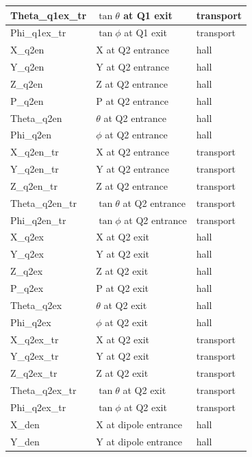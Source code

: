 \documentclass[11pt]{amsart}
\begin{document}
\begin{longtable}{| l | l | l |}
\hline
Theta\_q1ex\_tr       & $\tan{\theta}$ at Q1 exit  & transport\\
\hline
Phi\_q1ex\_tr         & $\tan{\phi}$ at Q1 exit  & transport\\
\hline
\hline
X\_q2en              & X at Q2 entrance  & hall \\
\hline
Y\_q2en              & Y at Q2 entrance  & hall \\
\hline
Z\_q2en              & Z at Q2 entrance  & hall \\
\hline
P\_q2en              & P at Q2 entrance  & hall \\
\hline
Theta\_q2en          & $\theta$ at Q2 entrance  & hall \\
\hline
Phi\_q2en            & $\phi$ at Q2 entrance  & hall \\
\hline
X\_q2en\_tr           & X at Q2 entrance  & transport\\
\hline
Y\_q2en\_tr           & Y at Q2 entrance  & transport\\
\hline
Z\_q2en\_tr           & Z at Q2 entrance  & transport\\
\hline
Theta\_q2en\_tr       & $\tan{\theta}$ at Q2 entrance  & transport\\
\hline
Phi\_q2en\_tr         & $\tan{\phi}$ at Q2 entrance  & transport\\
\hline
\hline
X\_q2ex              & X at Q2 exit  & hall \\
\hline
Y\_q2ex              & Y at Q2 exit  & hall \\
\hline
Z\_q2ex              & Z at Q2 exit  & hall \\
\hline
P\_q2ex              & P at Q2 exit  & hall \\
\hline
Theta\_q2ex          & $\theta$ at Q2 exit  & hall \\
\hline
Phi\_q2ex            & $\phi$ at Q2 exit  & hall \\
\hline
X\_q2ex\_tr           & X at Q2 exit  & transport\\
\hline
Y\_q2ex\_tr           & Y at Q2 exit  & transport\\
\hline
Z\_q2ex\_tr           & Z at Q2 exit  & transport\\
\hline
Theta\_q2ex\_tr       & $\tan{\theta}$ at Q2 exit  & transport\\
\hline
Phi\_q2ex\_tr         & $\tan{\phi}$ at Q2 exit  & transport\\
\hline
\hline
X\_den              & X at dipole entrance  & hall \\
\hline
Y\_den              & Y at dipole entrance  & hall \\

\end{longtable}
\end{document}
